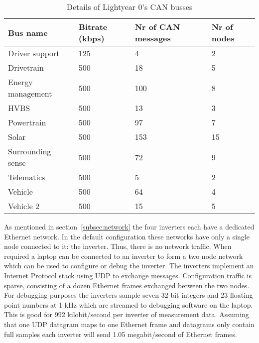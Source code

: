 \begin{table}[htb]
    \centering
    \begin{tabular}{@{}llll@{}}
    \toprule
    Bus name          & Bitrate (kbps) & Nr of CAN messages & Nr of nodes \\ \midrule
    Driver support    & 125            & 4                  & 2           \\
    Drivetrain        & 500            & 18                 & 5           \\
    Energy management & 500            & 100                & 8           \\
    HVBS              & 500            & 13                 & 3           \\
    Powertrain        & 500            & 97                 & 7           \\
    Solar             & 500            & 153                & 15          \\
    Surrounding sense & 500            & 72                 & 9           \\
    Telematics        & 500            & 5                  & 2           \\
    Vehicle           & 500            & 64                 & 4           \\
    Vehicle 2         & 500            & 15                 & 5           \\ \bottomrule
    \end{tabular}
    \caption{Details of Lightyear 0's CAN busses}
    \label{tab:can_busses}
\end{table}

As mentioned in section~\ref{subsec:network} the four inverters each have a dedicated Ethernet network. In the default configuration these networks have only a single node connected to it: the inverter. Thus, there is no network traffic. When required a laptop can be connected to an inverter to form a two node network which can be used to configure or debug the inverter. The inverters implement an Internet Protocol stack using UDP to exchange messages. Configuration traffic is sparse, consisting of a dozen Ethernet frames exchanged between the two nodes. For debugging purposes the inverters sample seven 32-bit integers and 23 floating point numbers at 1 kHz which are streamed to debugging software on the laptop. This is good for 992 kilobit/second per inverter of measurement data. Assuming that one UDP datagram maps to one Ethernet frame and datagrams only contain full samples each inverter will send 1.05 megabit/second of Ethernet frames. 

